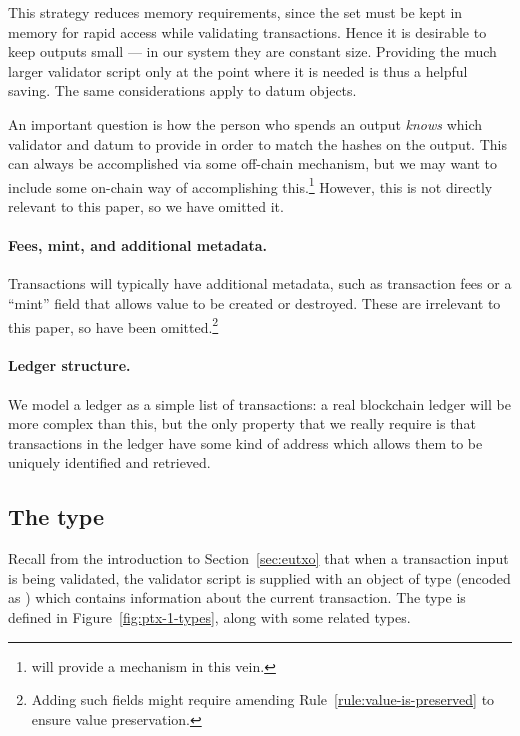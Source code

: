 This strategy reduces memory requirements, since
the \UTXO{} set must be kept in memory for rapid access while validating
transactions. Hence it is desirable to keep outputs small --- in
our system they are constant size.
Providing the much larger validator script only at the point where it is needed
is thus a helpful saving. The same considerations apply to datum objects.

An important question is how the person who spends an output \emph{knows} which
validator and datum to provide in order to match the hashes on the output.
This can always be accomplished via some off-chain mechanism, but we may
want to include some on-chain way of accomplishing this.\footnote{\Cardano{} will provide
a mechanism in this vein.} However, this is not directly relevant to this paper,
so we have omitted it.

\paragraph{Fees, mint, and additional metadata.}  Transactions will typically
have additional metadata, such as transaction fees or a ``mint''
field that allows value to be created or destroyed. These are
irrelevant to this paper, so have been omitted.\footnote{ Adding such
  fields might require amending Rule~\ref{rule:value-is-preserved}
  to ensure value preservation.  }

\paragraph{Ledger structure.} We model a ledger as a simple
list of transactions: a real blockchain ledger will be more complex
than this, but the only property that we really require is that
transactions in the ledger have some kind of address which allows them
to be uniquely identified and retrieved.

\subsection{The \ctx{} type}
\label{sec:validation-context}
Recall from the introduction to Section~\ref{sec:eutxo} that when a
transaction input is being validated, the validator script is supplied
with an object of type \ctx{} (encoded as \Data{}) which contains
information about the current transaction.  The \ctx{} type is defined
in Figure~\ref{fig:ptx-1-types}, along with some related types.

